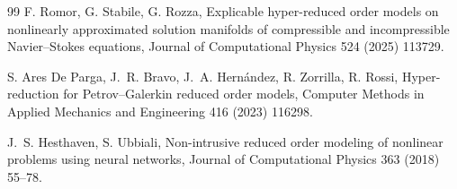 \begin{thebibliography}{99}
F. Romor, G. Stabile, G. Rozza,
Explicable hyper-reduced order models on nonlinearly approximated solution
manifolds of compressible and incompressible Navier--Stokes equations,
Journal of Computational Physics 524 (2025) 113729.

S. Ares De Parga, J.~R. Bravo, J.~A. Hern\'andez, R. Zorrilla, R. Rossi,
Hyper-reduction for Petrov--Galerkin reduced order models, Computer Methods
in Applied Mechanics and Engineering 416 (2023) 116298.

J.~S. Hesthaven, S. Ubbiali,
Non-intrusive reduced order modeling of nonlinear problems using neural
networks, Journal of Computational Physics 363 (2018) 55--78.

\end{thebibliography}
